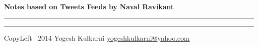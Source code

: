 

\usepackage{beamerarticle} %



\begin{center}
     \Large{\textbf{Notes based on Tweets Feeds by Naval Ravikant }}  %
\end{center}
\rule{\linewidth}{0.25pt}
\raggedright
\footnotesize
\begin{multicols}{3}




\rule{0.3\linewidth}{0.25pt}

\scriptsize
CopyLeft \textcopyleft\ 2014 Yogesh Kulkarni
\href{http://www.yogeshkulkarni.com}{yogeshkulkarni@yahoo.com}

\end{multicols}

